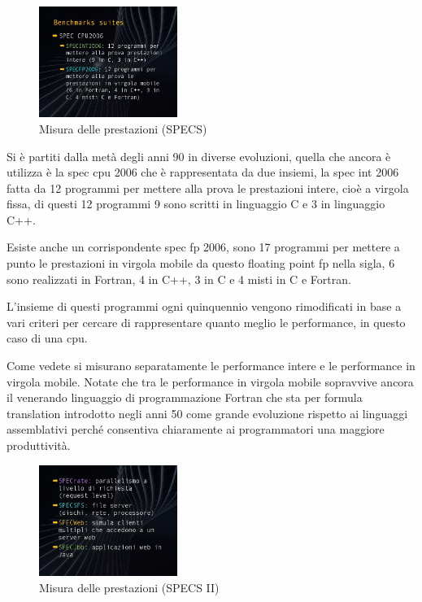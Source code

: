 \FloatBarrier
\begin{figure}[H]
  \centering
  \includegraphics[width=0.40\textwidth,
                    trim=40 40 10 40, %
                    clip]
                    {images/Lez03_p04_fig_01.png}
  \caption{Misura delle prestazioni (SPECS)}
  \label{fig:Lez03_p04_fig_01}
\end{figure}
\FloatBarrier
\noindent

Si è partiti dalla metà degli anni 90 in diverse evoluzioni, quella che ancora è utilizza è la spec cpu 2006 che è rappresentata da due insiemi, la spec int 2006 fatta da 12 programmi per mettere alla prova le prestazioni intere, cioè a virgola fissa, di questi 12 programmi 9 sono scritti in linguaggio C e 3 in linguaggio C++.

Esiste anche un corrispondente spec fp 2006, sono 17 programmi per mettere a punto le prestazioni in virgola mobile da questo floating point fp nella sigla, 6 sono realizzati in Fortran, 4 in C++, 3 in C e 4 misti in C e Fortran.

L'insieme di questi programmi ogni quinquennio vengono rimodificati in base a vari criteri per cercare di rappresentare quanto meglio le performance, in questo caso di una cpu.

Come vedete si misurano separatamente le performance intere e le performance in virgola mobile.
Notate che tra le performance in virgola mobile sopravvive ancora il venerando linguaggio di programmazione Fortran che sta per formula translation introdotto negli anni 50 come grande evoluzione rispetto ai linguaggi assemblativi perché consentiva chiaramente ai programmatori una maggiore produttività.

\FloatBarrier
\begin{figure}[H]
  \centering
  \includegraphics[width=0.40\textwidth,
                    trim=40 40 10 40, %
                    clip]
                    {images/Lez03_p04_fig_02.png}
  \caption{Misura delle prestazioni (SPECS II)}
  \label{fig:Lez03_p04_fig_02}
\end{figure}
\FloatBarrier
\noindent

